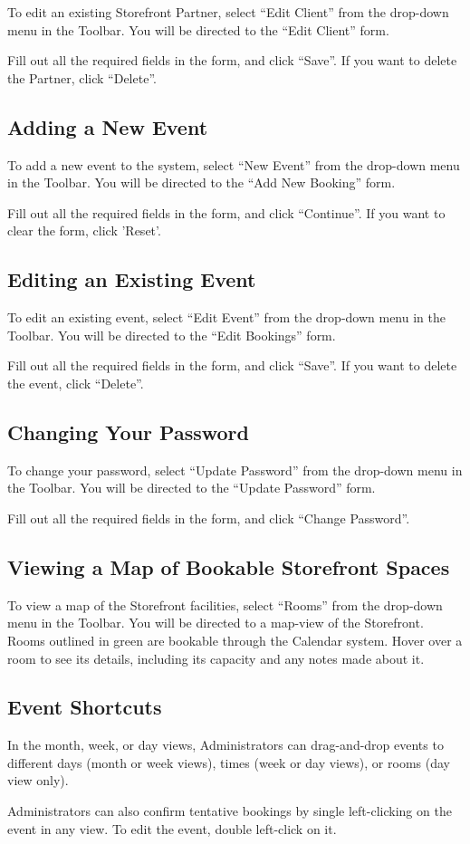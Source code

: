 To edit an existing Storefront Partner, select ``Edit Client'' from the drop-down menu in the Toolbar. You will be directed to the ``Edit Client'' form.

Fill out all the required fields in the form, and click ``Save''. If you want to delete the Partner, click ``Delete''.


\subsection{Adding a New Event}

To add a new event to the system, select ``New Event'' from the drop-down menu in the Toolbar. You will be directed to the ``Add New Booking'' form.

Fill out all the required fields in the form, and click ``Continue''. If you want to clear the form, click 'Reset'.


\subsection{Editing an Existing Event}

To edit an existing event, select ``Edit Event'' from the drop-down menu in the Toolbar. You will be directed to the ``Edit Bookings'' form.

Fill out all the required fields in the form, and click ``Save''. If you want to delete the event, click ``Delete''.


\subsection{Changing Your Password}

To change your password, select ``Update Password'' from the drop-down menu in the Toolbar. You will be directed to the ``Update Password'' form.

Fill out all the required fields in the form, and click ``Change Password''.


\subsection{Viewing a Map of Bookable Storefront Spaces}

To view a map of the Storefront facilities, select ``Rooms'' from the drop-down menu in the Toolbar. You will be directed to a map-view of the Storefront. Rooms outlined in green are bookable through the Calendar system. Hover over a room to see its details, including its capacity and any notes made about it.


\subsection{Event Shortcuts}

In the month, week, or day views, Administrators can drag-and-drop events to different days (month or week views), times (week or day views), or rooms (day view only).

Administrators can also confirm tentative bookings by single left-clicking on the event in any view. To edit the event, double left-click on it.


